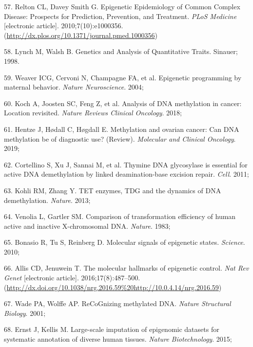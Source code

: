 \documentclass[11pt,twoside]{bristolthesis}
\newenvironment{cslreferences}%
  {}%
  {\par}
\begin{document}
\begin{cslreferences}
\leavevmode\hypertarget{ref-Relton2010}{}%
57. Relton CL, Davey Smith G. Epigenetic Epidemiology of Common Complex Disease: Prospects for Prediction, Prevention, and Treatment. \emph{PLoS Medicine} {[}electronic article{]}. 2010;7(10):e1000356. (\url{http://dx.plos.org/10.1371/journal.pmed.1000356})

\leavevmode\hypertarget{ref-Lynch1998}{}%
58. Lynch M, Walsh B. Genetics and Analysis of Quantitative Traits. Sinauer; 1998.

\leavevmode\hypertarget{ref-Weaver2004}{}%
59. Weaver ICG, Cervoni N, Champagne FA, et al. Epigenetic programming by maternal behavior. \emph{Nature Neuroscience}. 2004;

\leavevmode\hypertarget{ref-Koch2018}{}%
60. Koch A, Joosten SC, Feng Z, et al. Analysis of DNA methylation in cancer: Location revisited. \emph{Nature Reviews Clinical Oncology}. 2018;

\leavevmode\hypertarget{ref-Hentze2019}{}%
61. Hentze J, Hødall C, Høgdall E. Methylation and ovarian cancer: Can DNA methylation be of diagnostic use? (Review). \emph{Molecular and Clinical Oncology}. 2019;

\leavevmode\hypertarget{ref-Cortellino2011}{}%
62. Cortellino S, Xu J, Sannai M, et al. Thymine DNA glycosylase is essential for active DNA demethylation by linked deamination-base excision repair. \emph{Cell}. 2011;

\leavevmode\hypertarget{ref-Kohli2013}{}%
63. Kohli RM, Zhang Y. TET enzymes, TDG and the dynamics of DNA demethylation. \emph{Nature}. 2013;

\leavevmode\hypertarget{ref-Venolia1983}{}%
64. Venolia L, Gartler SM. Comparison of transformation efficiency of human active and inactive X-chromosomal DNA. \emph{Nature}. 1983;

\leavevmode\hypertarget{ref-Bonasio2010}{}%
65. Bonasio R, Tu S, Reinberg D. Molecular signals of epigenetic states. \emph{Science}. 2010;

\leavevmode\hypertarget{ref-Allis2016}{}%
66. Allis CD, Jenuwein T. The molecular hallmarks of epigenetic control. \emph{Nat Rev Genet} {[}electronic article{]}. 2016;17(8):487--500. (\url{http://dx.doi.org/10.1038/nrg.2016.59\%20http://10.0.4.14/nrg.2016.59})

\leavevmode\hypertarget{ref-Wade2001}{}%
67. Wade PA, Wolffe AP. ReCoGnizing methylated DNA. \emph{Nature Structural Biology}. 2001;

\leavevmode\hypertarget{ref-Ernst2015}{}%
68. Ernst J, Kellis M. Large-scale imputation of epigenomic datasets for systematic annotation of diverse human tissues. \emph{Nature Biotechnology}. 2015;


\end{cslreferences}
\end{document}

